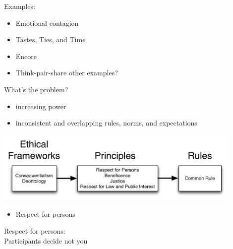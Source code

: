 \documentclass{beamer}
\begin{document}
\begin{frame}

Examples:
\begin{itemize}
\item Emotional contagion
\pause
\item Tastes, Ties, and Time
\pause
\item Encore
\pause
\item Think-pair-share other examples?
\end{itemize}

\end{frame}
\begin{frame}

What's the problem?
\begin{itemize}
\item increasing power
\pause
\item inconsistent and overlapping rules, norms, and expectations
\end{itemize}

\end{frame}
\begin{frame}

\begin{center}
\includegraphics[width=0.9\textwidth]{figures/ethics_schematic_simple.png}
\end{center}

\end{frame}
\begin{frame}

\begin{itemize}
\item Respect for persons
\end{itemize}

\end{frame}
\begin{frame}

Respect for persons:\\
Participants decide not you

\end{frame}
\end{document}
